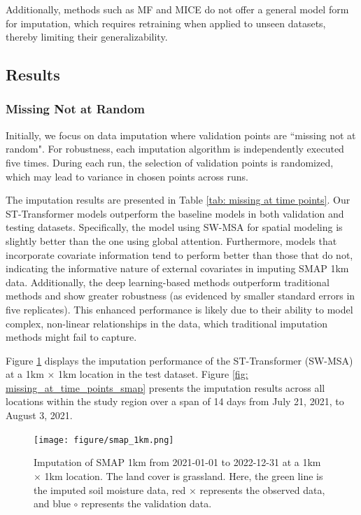 \documentclass[11pt]{article}
\begin{document}
Additionally, methods such as MF and MICE do not offer a general model form for imputation, which requires retraining when applied to unseen datasets, thereby limiting their generalizability.



\subsection{Results}
\subsubsection*{Missing Not at Random}
Initially, we focus on data imputation where validation points are ``missing not at random". For robustness, each imputation algorithm is independently executed five times. During each run, the selection of validation points is randomized, which may lead to variance in chosen points across runs.

The imputation results are presented in Table \ref{tab: missing at time points}. Our ST-Transformer models outperform the baseline models in both validation and testing datasets. Specifically, the model using SW-MSA for spatial modeling is slightly better than the one using global attention. Furthermore, models that incorporate covariate information tend to perform better than those that do not, indicating the informative nature of external covariates in imputing SMAP 1km data. Additionally, the deep learning-based methods outperform traditional methods and show greater robustness (as evidenced by smaller standard errors in five replicates). This enhanced performance is likely due to their ability to model complex, non-linear relationships in the data, which traditional imputation methods might fail to capture. 


Figure \ref{fig: imputation_result} displays the imputation performance of the ST-Transformer (SW-MSA) at a 1km $\times$ 1km location in the test dataset.  Figure \ref{fig: missing_at_time_points_smap} presents the imputation results across all locations within the study region over a span of 14 days from July 21, 2021, to August 3, 2021.

\begin{figure}
\centering
\texttt{[image: figure/smap\_1km.png]}
\caption{Imputation of SMAP 1km from 2021-01-01 to 2022-12-31 at a 1km $\times$ 1km location. The land cover is grassland. Here, the green line is the imputed soil moisture data, red $\times$ represents the observed data, and blue $\circ$ represents the validation data.}
\label{fig: imputation_result}
\end{figure}
\end{document}
